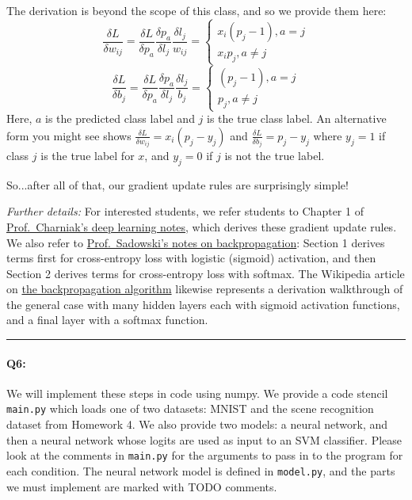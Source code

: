 The derivation is beyond the scope of this class, and so we provide them here:
\begin{equation}
\frac{\delta L}{\delta w_{ij}} = \frac{\delta L}{\delta p_a} \frac{\delta p_a}{\delta l_j} \frac{\delta l_j}{w_{ij}} =\begin{cases}
x_i(p_j-1), a = j\\
x_ip_j,  a\neq j
\end{cases}
\label{eq:wupdate}
\end{equation}
\begin{equation}
\frac{\delta L}{\delta b_j} = \frac{\delta L}{\delta p_a} \frac{\delta p_a}{\delta l_j} \frac{\delta l_j}{b_j} =\begin{cases}
(p_j-1), a = j\\
p_j,  a\neq j
\end{cases}
\label{eq:bupdate}
\end{equation}
Here, $a$ is the predicted class label and $j$ is the true class label. An alternative form you might see shows $\frac{\delta L}{\delta w_{ij}} = x_i(p_j-y_j)$ and $\frac{\delta L}{\delta b_j} = p_j-y_j$ where $y_j=1$ if class $j$ is the true label for $x$, and $y_j = 0$ if $j$ is not the true label.

So...after all of that, our gradient update rules are surprisingly simple!

\emph{Further details:} For interested students, we refer students to Chapter 1 of \href{https://cs.brown.edu/courses/csci1460/assets/files/deep-learning.pdf}{Prof.~Charniak's deep learning notes}, which derives these gradient update rules. We also refer to \href{https://www.ics.uci.edu/~pjsadows/notes.pdf}{Prof.~Sadowski's notes on backpropagation}: Section 1 derives terms first for cross-entropy loss with logistic (sigmoid) activation, and then Section 2 derives terms for cross-entropy loss with softmax. The Wikipedia article on \href{https://en.wikipedia.org/wiki/Backpropagation}{the backpropagation algorithm} likewise represents a derivation walkthrough of the general case with many hidden layers each with sigmoid activation functions, and a final layer with a softmax function.

\hspace{\fill}\rule{0.5\linewidth}{.5pt}\hspace{\fill}


\paragraph{Q6:} We will implement these steps in code using numpy. We provide a code stencil \texttt{main.py} which loads one of two datasets: MNIST and the scene recognition dataset from Homework 4. We also provide two models: a neural network, and then a neural network whose logits are used as input to an SVM classifier. Please look at the comments in \texttt{main.py} for the arguments to pass in to the program for each condition. The neural network model is defined in \texttt{model.py}, and the parts we must implement are marked with TODO comments.

